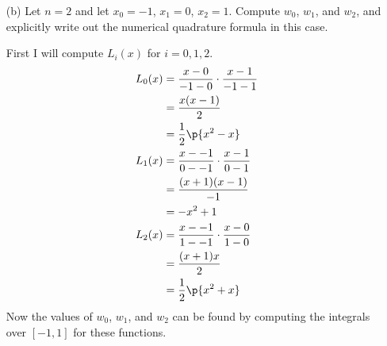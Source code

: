 \documentclass[11pt]{article}
\begin{document}
\begin{enumerate}
\begin{enumerate}
\begin{proof}
\begin{align*}
                        &= (-1)^{n+1} \prod{i=0}{n}{x + x_i}
                        \intertext{Since $n$ is even $(-1)^{n+1} = -1$}
                        &= -\prod{i=0}{n}{x + x_i}
                        \intertext{Since $x_i = -x_{n-i}$}
                        &= -\prod{i=0}{n}{x - x_{n-i}}
                        \intertext{This product is multiplying the same terms as
                            $p(x)$, so this product is equivalent to $p(x)$.}
                        &= -p(x)
                    \end{align*}
                    Therefore $p(x) = \prod{i=0}{n}{x - x_i}$ is an odd function,
                    and so the integral $\dintt{-1}{1}{p(x)}{x} = 0$.
                    Therefore $E(f) = 0$ for $f \in \PP_{n+1}$, and
                    so this numerical quadrature is exact for all polynomials
                    whose degree is at most $n+1$.
                \end{proof}

            \item[(b)] %
                Let $n = 2$ and let $x_0 = -1$, $x_1 = 0$, $x_2 = 1$.
                Compute $w_0$, $w_1$, and $w_2$, and explicitly write out the
                numerical quadrature formula in this case.

                First I will compute $L_i(x)$ for $i = 0, 1, 2$.
                \begin{align*}
                    L_0(x) &= \frac{x - 0}{-1 - 0} \cdot \frac{x-1}{-1-1} \\
                    &= \frac{x(x-1)}{2} \\
                    &= \frac{1}{2}\p{x^2 - x} \\
                    L_1(x) &= \frac{x - -1}{0 - -1} \cdot \frac{x - 1}{0 - 1} \\
                    &= \frac{(x + 1)(x - 1)}{-1} \\
                    &= -x^2 + 1 \\
                    L_2(x) &= \frac{x - -1}{1 - -1} \cdot \frac{x - 0}{1 - 0} \\
                    &= \frac{(x + 1)x}{2} \\
                    &= \frac{1}{2}\p{x^2 + x}
                \end{align*}
                Now the values of $w_0$, $w_1$, and $w_2$ can be found by computing
                the integrals over $[-1, 1]$ for these functions.


\end{enumerate}
\end{enumerate}
\end{document}
